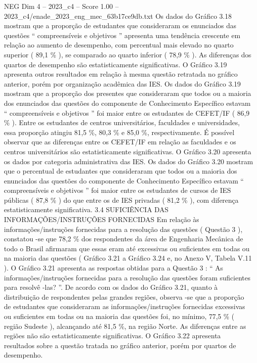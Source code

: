 \begin{textsample}{NEG Dim 4 – 2023\_c4 – Score 1.00 – 2023\_c4/enade\_2023\_eng\_mec\_63b17ce9db.txt}
Os dados do Gráfico 3.18 mostram que a proporção de estudantes que consideraram os enunciados das questões “ compreensíveis e objetivos ” apresenta uma tendência crescente em relação ao aumento de desempenho, com percentual mais elevado no quarto superior ( 89,1 \% ), se comparado ao quarto inferior ( 78,9 \% ).
As diferenças dos quartos de desempenho são estatisticamente significativas.
O Gráfico 3.19 apresenta outros resultados em relação à mesma questão retratada no gráfico anterior, porém por organização acadêmica das IES.
Os dados do Gráfico 3.19 mostram que a proporção dos presentes que consideraram que todos ou a maioria dos enunciados das questões do componente de Conhecimento Específico estavam “ compreensíveis e objetivos ” foi maior entre os estudantes de CEFET/IF ( 86,9 \% ).
Entre os estudantes de centros universitários, faculdades e universidades, essa proporção atingiu 81,5 \%, 80,3 \% e 85,0 \%, respectivamente.
É possível observar que as diferenças entre os CEFET/IF em relação as faculdades e os centros universitários são estatisticamente significativas.
O Gráfico 3.20 apresenta os dados por categoria administrativa das IES.
Os dados do Gráfico 3.20 mostram que o percentual de estudantes que consideraram que todos ou a maioria dos enunciados das questões do componente de Conhecimento Específico estavam “ compreensíveis e objetivos ” foi maior entre os estudantes de cursos de IES públicas ( 87,8 \% ) do que entre os de IES privadas ( 81,2 \% ), com diferença estatisticamente significativa. 3.4 SUFICIÊNCIA DAS INFORMAÇÕES/INSTRUÇÕES FORNECIDAS Em relação às informações/instruções fornecidas para a resolução das questões ( Questão 3 ), constatou -se que 78,2 \% dos respondentes da área de Engenharia Mecânica de todo o Brasil afirmaram que essas eram até excessivas ou suficientes em todas ou na maioria das questões ( Gráfico 3.21 a Gráfico 3.24 e, no Anexo V, Tabela V.11 ).
O Gráfico 3.21 apresenta as respostas obtidas para a Questão 3 : “ As informações/instruções fornecidas para a resolução das questões foram suficientes para resolvê -las? ”.
De acordo com os dados do Gráfico 3.21, quanto à distribuição de respondentes pelas grandes regiões, observa -se que a proporção de estudantes que consideraram as informações/instruções fornecidas excessivas ou suficientes em todas ou na maioria das questões foi, no mínimo, 77,5 \% ( região Sudeste ), alcançando até 81,5 \%, na região Norte.
As diferenças entre as regiões não são estatisticamente significativas.
O Gráfico 3.22 apresenta resultados sobre a questão tratada no gráfico anterior, porém por quartos de desempenho.

\end{textsample}
